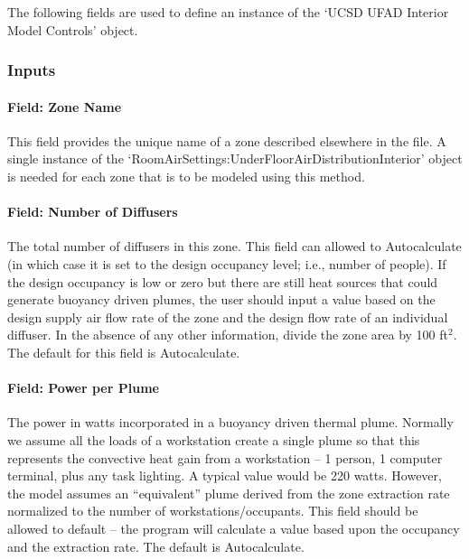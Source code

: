 The following fields are used to define an instance of the `UCSD UFAD Interior Model Controls' object.

\subsubsection{Inputs}\label{inputs-2016-06-17-0938}

\paragraph{Field: Zone Name}\label{field-zone-name-6-003}

This field provides the unique name of a zone described elsewhere in the file. A single instance of the `RoomAirSettings:UnderFloorAirDistributionInterior' object is needed for each zone that is to be modeled using this method.

\paragraph{Field: Number of Diffusers}\label{field-number-of-diffusers}

The total number of diffusers in this zone. This field can allowed to Autocalculate (in which case it is set to the design occupancy level; i.e., number of people). If the design occupancy is low or zero but there are still heat sources that could generate buoyancy driven plumes, the user should input a value based on the design supply air flow rate of the zone and the design flow rate of an individual diffuser. In the absence of any other information, divide the zone area by 100 ft\(^{2}\). The default for this field is Autocalculate.

\paragraph{Field: Power per Plume}\label{field-power-per-plume}

The power in watts incorporated in a buoyancy driven thermal plume. Normally we assume all the loads of a workstation create a single plume so that this represents the convective heat gain from a workstation -- 1 person, 1 computer terminal, plus any task lighting. A typical value would be 220 watts. However, the model assumes an ``equivalent'' plume derived from the zone extraction rate normalized to the number of workstations/occupants. This field should be allowed to default -- the program will calculate a value based upon the occupancy and the extraction rate. The default is Autocalculate.

